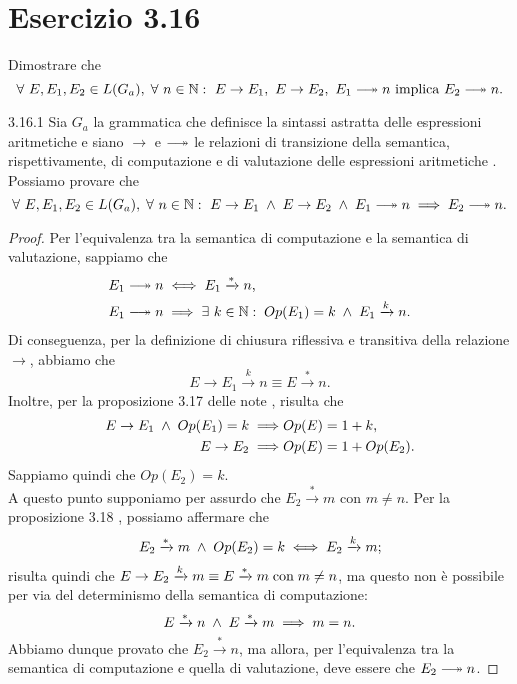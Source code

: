 \section*{Esercizio 3.16}
{}
\label{es:3.16}

\begin{tcolorbox} \cite{mssc2016}
Dimostrare che \[
	\forall \ E, E_1, E_2 \in L(G_a) \valeche
	\forall \ n \in \N:
		\ E \rightarrow E_1, 
		\ E \rightarrow E_2, 
		\ E_1 \longtwoheadrightarrow n
		\ \text{implica}
		\ E_2 \longtwoheadrightarrow n.
\]
\end{tcolorbox}

\begin{customthm}{3.16.1} \label{th:3.16.1}
Sia $G_a$ la grammatica che definisce la sintassi astratta delle espressioni aritmetiche e siano $\rightarrow$ e $\longtwoheadrightarrow$ le relazioni di transizione della semantica, rispettivamente, di computazione e di valutazione delle espressioni aritmetiche \cite{mssc2016}. Possiamo provare che \[
	\forall \ E, E_1, E_2 \in L(G_a) \valeche
	\forall \ n \in \N:
		\ E \rightarrow E_1 \myland E \rightarrow E_2 \myland E_1 \longtwoheadrightarrow n
		\implies E_2 \longtwoheadrightarrow n.
\]
\end{customthm}

\begin{proof}
Per l'equivalenza tra la semantica di computazione e la semantica di valutazione, sappiamo che
\begin{align*}
	& E_1 \longtwoheadrightarrow n \iff E_1 \xrightarrow{*} n \text{,} \\
	& E_1 \longtwoheadrightarrow n \implies 
		\exists \ k \in \N \tc Op(E_1)=k \myland E_1 \xrightarrow{k} n.
\end{align*}
Di conseguenza, per la definizione di chiusura riflessiva e transitiva della relazione $\rightarrow$, abbiamo che \[
	E \rightarrow E_1 \xrightarrow{k} n \equiv E \xrightarrow{*} n.
\]
Inoltre, per la proposizione 3.17 delle note \cite{mssc2016}, risulta che
\begin{align*}
	E \rightarrow E_1 \; \land \; Op(E_1)=k \implies & Op(E)=1+k \text{,}\\
	E \rightarrow E_2 \implies & Op(E)=1+Op(E_2).
\end{align*}
Sappiamo quindi che $Op(E_2)=k$.\\
A questo punto supponiamo per assurdo che $E_2 \xrightarrow{*} m$ con $m \neq n$.
Per la proposizione 3.18 \cite{mssc2016}, possiamo affermare che \[
	E_2 \xrightarrow{*} m \; \land \; Op(E_2)=k \iff E_2 \xrightarrow{k} m;
\]
risulta quindi che $E \rightarrow E_2 \xrightarrow{k} m \equiv E \xrightarrow{*} m \; \text{con} \; m \neq n$, ma questo non è possibile per via del determinismo della semantica di computazione: \[
	E \xrightarrow{*} n \; \land \; E \xrightarrow{*} m \implies m = n.
\]
Abbiamo dunque provato che $E_2 \xrightarrow{*} n$, ma allora, per l'equivalenza tra la semantica di computazione e quella di valutazione, deve essere che $E_2 \longtwoheadrightarrow n$.
\end{proof}

